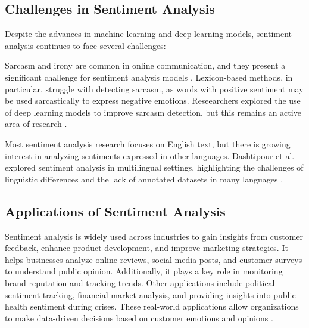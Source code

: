 \subsection{Challenges in Sentiment Analysis}

Despite the advances in machine learning and deep learning models, sentiment analysis continues to face several challenges:

Sarcasm and irony are common in online communication, and they present a significant challenge for sentiment analysis models \cite{Meriem2021}. Lexicon-based methods, in particular, struggle with detecting sarcasm, as words with positive sentiment may be used sarcastically to express negative emotions. Reseearchers explored the use of deep learning models to improve sarcasm detection, but this remains an active area of research \cite{Pozzi2017}.

Most sentiment analysis research focuses on English text, but there is growing interest in analyzing sentiments expressed in other languages. Dashtipour et al. explored sentiment analysis in multilingual settings, highlighting the challenges of linguistic differences and the lack of annotated datasets in many languages \cite{Dashtipour2016}.

\subsection{Applications of Sentiment Analysis}

Sentiment analysis is widely used across industries to gain insights from customer feedback, enhance product development, and improve marketing strategies. It helps businesses analyze online reviews, social media posts, and customer surveys to understand public opinion. Additionally, it plays a key role in monitoring brand reputation and tracking trends. Other applications include political sentiment tracking, financial market analysis, and providing insights into public health sentiment during crises. These real-world applications allow organizations to make data-driven decisions based on customer emotions and opinions \cite{nobledesktop2024}.






